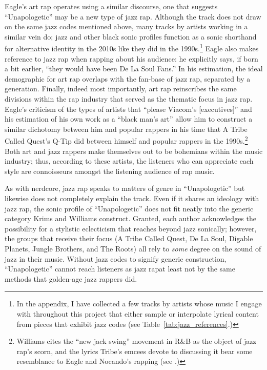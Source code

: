 Eagle's art rap operates using a similar discourse, one that suggests ``Unapologetic'' may be a new
type of jazz rap. Although the track does not draw on the same jazz codes mentioned above, many tracks 
by artists working in a similar vein do; jazz and other black sonic profiles function as a sonic 
shorthand for alternative identity in the 2010s like they did in the 1990s.\footnote{
    In the appendix, I have collected a few tracks by artists whose music I engage with throughout 
    this project that either sample or interpolate lyrical content from pieces that exhibit jazz codes 
    (see Table~\ref{tab:jazz_references}.)}
Eagle also makes reference to jazz rap when rapping about his audience: he explicitly says, if born
a  bit earlier, ``they would have been De La Soul Fans.'' In his estimation, the ideal demographic
for art  rap overlaps with the fan-base of jazz rap, separated by a generation. Finally, indeed most
importantly, art rap reinscribes the same divisions within the rap industry that served as the thematic
focus in jazz rap. Eagle's criticism of the types of artists that ``please Viacom's [executives]'' and
his  estimation of his own work as a ``black man's art'' allow him to construct a similar dichotomy between
him and popular rappers in his time that A Tribe Called Quest's Q-Tip did between himself and popular
rappers in the 1990s.\footnote{
    Williams cites the ``new jack swing'' movement in R\&B as the object of jazz rap's scorn, and the
    lyrics Tribe's emcees devote to discussing it bear some resemblance to Eagle and Nocando's rapping
    (see \autocite[56]{justinawilliamsRhyminStealinMusical2013}.)}
Both art and jazz rappers make themselves out to be bohemians within the music industry; thus, according
to these artists, the listeners who can appreciate each style are connoisseurs amongst the listening 
audience of rap music.

As with nerdcore, jazz rap speaks to matters of genre in ``Unapologetic'' but likewise does not completely
explain the track. Even if it shares an ideology with jazz rap, the sonic profile of ``Unapologetic'' does
not fit neatly into the generic category Krims and Williams construct. Granted, each author acknowledges the
possibility for a stylistic eclecticism that reaches beyond jazz sonically; however, the groups that receive
their focus (A Tribe Called Quest, De La Soul, Digable Planets, Jungle Brothers, and The Roots) all rely to
\emph{some} degree on the sound of jazz in their music. Without jazz codes to signify generic construction,
``Unapologetic'' cannot reach listeners as jazz rap\textemdash at least not by the same methods that 
golden-age jazz rappers did.

